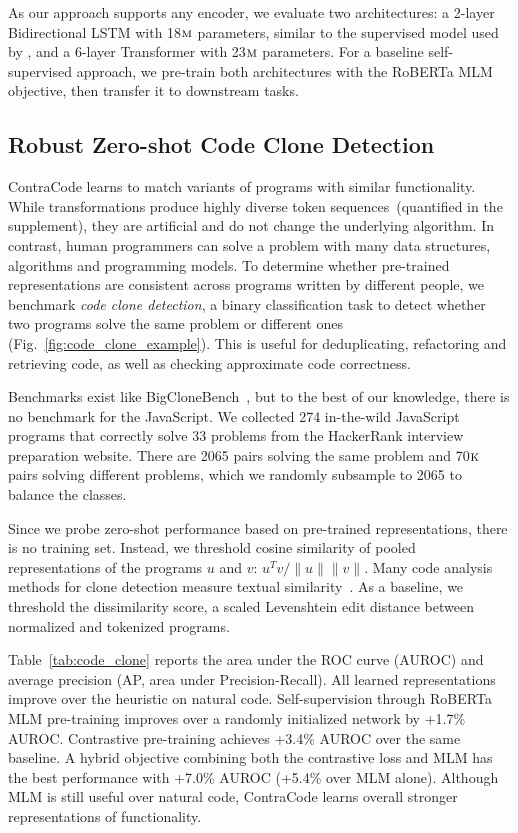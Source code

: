 \documentclass[11pt]{article}
\newcommand{\thou}[0]{$\textsc{k}$}
\newcommand{\million}[0]{$\textsc{m}$}
\newcommand{\ours}[0]{ContraCode}
\begin{document}
As our approach supports any encoder, we evaluate two architectures: a 2-layer Bidirectional LSTM with 18\million{} parameters, similar to the supervised model used by \citet{hellendoorn2018deep}, and a 6-layer Transformer with 23\million{} parameters.
For a baseline self-supervised approach, we pre-train both architectures with the RoBERTa MLM objective, then transfer it to downstream tasks.

\subsection{Robust Zero-shot Code Clone Detection}
\label{sec:experiments_code_clone}

\ours{} learns to match variants of programs with similar functionality. While transformations produce highly diverse token sequences~(quantified in the supplement), they are artificial and do not change the underlying algorithm. In contrast, human programmers can solve a problem with many data structures, algorithms and programming models. To determine whether pre-trained representations are consistent across programs written by different people, we benchmark \textit{code clone detection}, a binary classification task to detect whether two programs solve the same problem or different ones (Fig.~\ref{fig:code_clone_example}). This is useful for deduplicating, refactoring and retrieving code, as well as checking approximate code correctness.

Benchmarks exist like BigCloneBench~\citep{10.1109/ICSME.2014.77}, but to the best of our knowledge, there is no benchmark for the JavaScript. We collected 274 in-the-wild JavaScript programs that correctly solve 33 problems from the HackerRank interview preparation website. 
There are 2065 pairs solving the same problem and 70\thou{} pairs solving different problems, which we randomly subsample to 2065 to balance the classes.

Since we probe zero-shot performance based on pre-trained representations, there is no training set. Instead, we threshold cosine similarity of pooled representations of the programs $u$ and $v$: $u^T v / \|u\|\|v\|$.
Many code analysis methods for clone detection measure textual similarity~\cite{Baker92aprogram}. As a baseline, we threshold the dissimilarity score, a scaled Levenshtein edit distance between normalized and tokenized programs.

Table~\ref{tab:code_clone} reports the area under the ROC curve (AUROC) and average precision (AP, area under Precision-Recall). All learned representations improve over the heuristic on natural code. Self-supervision through RoBERTa MLM pre-training improves over a randomly initialized network by +1.7\% AUROC. Contrastive pre-training achieves +3.4\% AUROC over the same baseline. A hybrid objective combining both the contrastive loss and MLM has the best performance with +7.0\% AUROC (+5.4\% over MLM alone). Although MLM is still useful over natural code, \ours{} learns overall stronger representations of functionality.
\end{document}
